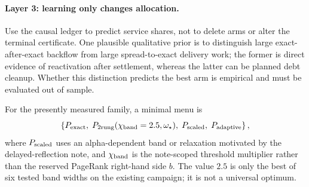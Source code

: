 \paragraph{Layer 3: learning only changes allocation.}
Use the causal ledger to predict service shares, not to delete arms or alter
the terminal certificate.  One plausible qualitative prior is to distinguish
large exact-after-exact backflow from large spread-to-exact delivery work;
the former is direct evidence of reactivation after settlement, whereas the
latter can be planned debt cleanup.  Whether this distinction predicts the
best arm is empirical and must be evaluated out of sample.

For the presently measured family, a minimal menu is
\begin{equation}
 \left\{
  P_{\rm exact},\;
  P_{\rm 2rung}(\chi_{\rm band}=2.5,\omega_\star),\;
  P_{\rm scaled},\;
  P_{\rm adaptive}
 \right\},
 \label{eq:menu}
\end{equation}
where $P_{\rm scaled}$ uses an alpha-dependent band or relaxation motivated
by the delayed-reflection note, and $\chi_{\rm band}$ is the note-scoped
threshold multiplier rather than the reserved PageRank right-hand side $b$.
The value $2.5$ is only the best of six
tested band widths on the existing campaign; it is not a universal optimum.
